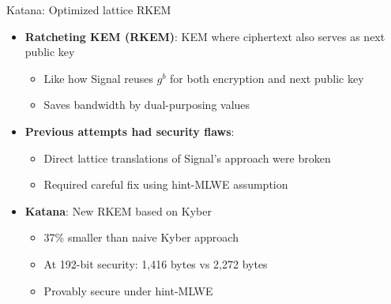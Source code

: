 \documentclass[aspectratio=169, lualatex, handout]{beamer}
\begin{document}
\begin{frame}{Katana: Optimized lattice RKEM}
	\begin{itemize}
		\item \textbf{Ratcheting KEM (RKEM)}: KEM where ciphertext also serves as next public key
		      \begin{itemize}
			      \item Like how Signal reuses $g^b$ for both encryption and next public key
			      \item Saves bandwidth by dual-purposing values
		      \end{itemize}
		\item \textbf{Previous attempts had security flaws}:
		      \begin{itemize}
			      \item Direct lattice translations of Signal's approach were broken
			      \item Required careful fix using hint-MLWE assumption
		      \end{itemize}
		\item \textbf{Katana}: New RKEM based on Kyber
		      \begin{itemize}
			      \item 37\% smaller than naive Kyber approach
			      \item At 192-bit security: 1,416 bytes vs 2,272 bytes
			      \item Provably secure under hint-MLWE
		      \end{itemize}
	\end{itemize}
\end{frame}
\end{document}
